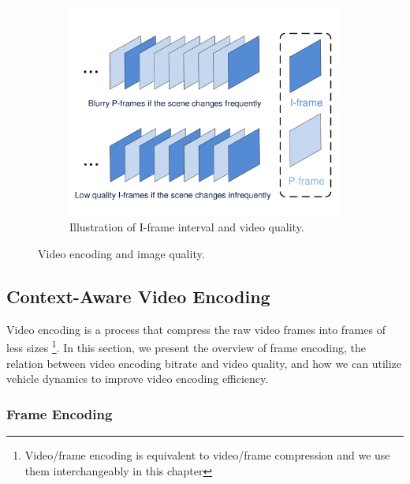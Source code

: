 \begin{figure}[ht]
\begin{subfigure}[t]{0.32\textwidth}
    \includegraphics[width=\linewidth]{Figs/RTDrive/intervals.pdf}
    \caption{Illustration of I-frame interval and video quality.}
    \label{interval}
  \end{subfigure}
\caption{Video encoding and image quality.}
\end{figure}


\subsection{Context-Aware Video Encoding}


Video encoding is a process that compress the raw video frames 
into frames of less sizes 
\footnote{Video/frame encoding is equivalent to video/frame compression 
and we use them interchangeably in this chapter}.
In this section, we present the overview of frame encoding, 
the relation between video encoding bitrate and video
quality, and how we can utilize
vehicle dynamics to improve video encoding efficiency.  

\subsubsection{Frame Encoding}
\label{sec_frame_encoding}




